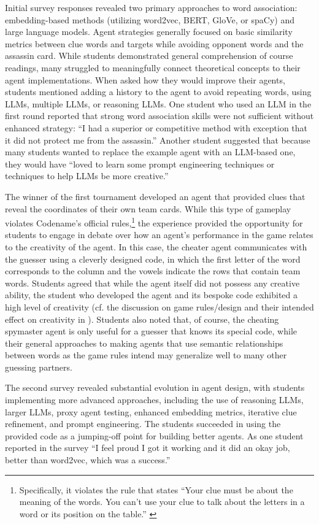 \documentclass[phd,electronic,oneside,twosidetoc,letterpaper,chaptercenter,parttop,lof]{byumsphd}
\begin{document}
Initial survey responses revealed two primary approaches to word association: embedding-based methods (utilizing word2vec, BERT, GloVe, or spaCy) and large language models. Agent strategies generally focused on basic similarity metrics between clue words and targets while avoiding opponent words and the assassin card. While students demonstrated general comprehension of course readings, many struggled to meaningfully connect theoretical concepts to their agent implementations. When asked how they would improve their agents, students mentioned adding a history to the agent to avoid repeating words, using LLMs, multiple LLMs, or reasoning LLMs. One student who used an LLM in the first round reported that strong word association skills were not sufficient without enhanced strategy: ``I had a superior or competitive method with exception that it did not protect me from the assassin.'' Another student suggested that because many students wanted to replace the example agent with an LLM-based one, they would have ``loved to learn some prompt engineering techniques or techniques to help LLMs be more creative.''

The winner of the first tournament developed an agent that provided clues that reveal the coordinates of their own team cards. While this type of gameplay violates Codename's official rules,\footnote{Specifically, it violates the rule that states “Your clue must be about the meaning of the words. You can't use your clue to talk about the letters in a word or its position on the table.” \cite{codenames2015rules}} the experience provided the opportunity for students to engage in debate over how an agent's performance in the game relates to the creativity of the agent. In this case, the cheater agent communicates with the guesser using a cleverly designed  code, in which the first letter of the word corresponds to the column and the vowels indicate the rows that contain team words. Students agreed that while the agent itself did not possess any creative ability, the student who developed the agent and its bespoke code exhibited a high level of creativity (cf. the discussion on game rules/design and their intended effect on creativity in \cite{spendlove2023}).  Students also noted that, of course, the cheating spymaster agent is only useful for a guesser that knows its special code, while their general approaches to making agents that use semantic relationships between words as the game rules intend may generalize well to many other guessing partners.

The second survey revealed substantial evolution in agent design, with students implementing more advanced approaches, including the use of reasoning LLMs, larger LLMs, proxy agent testing, enhanced embedding metrics, iterative clue refinement, and prompt engineering. The students succeeded in using the provided code as a jumping-off point for building better agents. As one student reported in the survey ``I feel proud I got it working and it did an okay job, better than word2vec, which was a success.''
\end{document}
